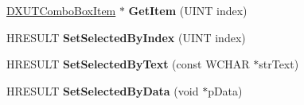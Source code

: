 \begin{DoxyCompactItemize}
\item 
\hypertarget{class_c_d_x_u_t_combo_box_a2235c56b715f74aea5aa175cf0a8caa8}{\hyperlink{struct_d_x_u_t_combo_box_item}{D\+X\+U\+T\+Combo\+Box\+Item} $\ast$ {\bfseries Get\+Item} (U\+I\+N\+T index)}\label{class_c_d_x_u_t_combo_box_a2235c56b715f74aea5aa175cf0a8caa8}

\item 
\hypertarget{class_c_d_x_u_t_combo_box_aa4b0062f2e1a3a01c2fcc63a652482ef}{H\+R\+E\+S\+U\+L\+T {\bfseries Set\+Selected\+By\+Index} (U\+I\+N\+T index)}\label{class_c_d_x_u_t_combo_box_aa4b0062f2e1a3a01c2fcc63a652482ef}

\item 
\hypertarget{class_c_d_x_u_t_combo_box_a6efbd6c0b3cbd66389ad21e25e5fbb14}{H\+R\+E\+S\+U\+L\+T {\bfseries Set\+Selected\+By\+Text} (const W\+C\+H\+A\+R $\ast$str\+Text)}\label{class_c_d_x_u_t_combo_box_a6efbd6c0b3cbd66389ad21e25e5fbb14}

\item 
\hypertarget{class_c_d_x_u_t_combo_box_a66f4a4f8a88f37f0719942b7eac7fed8}{H\+R\+E\+S\+U\+L\+T {\bfseries Set\+Selected\+By\+Data} (void $\ast$p\+Data)}\label{class_c_d_x_u_t_combo_box_a66f4a4f8a88f37f0719942b7eac7fed8}

\end{DoxyCompactItemize}
